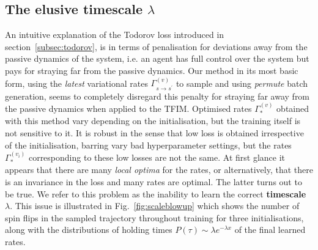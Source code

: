 \subsection{The elusive timescale $\lambda$}
\label{subsec:elusive_lambda}
An intuitive explanation of the Todorov loss introduced in section~\ref{subsec:todorov}, is in terms of penalisation for deviations away from the passive dynamics of the system, i.e. an agent has full control over the system but pays for straying far from the passive dynamics. Our method in its most basic form, using the \emph{latest} variational rates $\Gamma^{(v)}_{s \rightarrow s^\prime}$ to sample and using \emph{permute} batch generation, seems to completely disregard this penalty for straying far away from the passive dynamics when applied to the TFIM. Optimised rates $\Gamma_*^{(v)}$ obtained with this method vary depending on the initialisation, but the training itself is not sensitive to it. It is robust in the sense that low loss is obtained irrespective of the initialisation, barring vary bad hyperparameter settings, but the rates $\Gamma_*^{(v_i)}$ corresponding to these low losses are not the same. At first glance it appears that there are many \emph{local optima} for the rates, or alternatively, that there is an invariance in the loss and many rates are optimal. The latter turns out to be true. We refer to this problem as the inability to learn the correct \textbf{timescale} $\lambda$. This issue is illustrated in Fig.~\ref{fig:scaleblowup} which shows the number of spin flips in the sampled trajectory throughout training for three initialisations, along with the distributions of holding times $P(\tau) \sim \lambda e^{-\lambda x}$ of the final learned rates.
